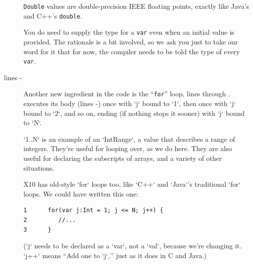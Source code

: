 \begin{description}
{\tt Double} values are double-precision IEEE floating points, exactly like Java's and C++'s
{\tt double}.  

You do need to supply
the type for a {\tt var} even when an initial value is provided.
The rationale is a bit involved, so we ask you just to take our word for it that  
for now, the compiler needs to be told the type of every {\tt var}. 

\item[lines  \xlref{mpi1-for}{7}- \xlref{mpi1-endfor}{11}]
Another new ingredient in the code is the ``{\tt for}''  loop, lines
 through .  
 executes its body (lines
-) once with \xcd`j` bound to \xcd`1`, then
once with \xcd`j` bound to \xcd`2`, and so on, ending (if nothing stops it
sooner) with \xcd`j` bound to \xcd`N`.  

\xcd`1..N` is an example of an \xcd`IntRange`, a value that describes a range
of integers.  They're useful for looping over, as we do here.  They are also
useful for declaring the subscripts of arrays, and a variety of other
situations. 


X10 has old-style \xcd`for` loops too, like \xcd`C++` and \xcd`Java`'s
traditional \xcd`for` loops.  We could have written this one:
\begin{verbatim}
1      for(var j:Int = 1; j <= N; j++) {
2         //...
3      }
\end{verbatim}
(\xcd`j` needs to be declared as a \xcd`var`, not a \xcd`val`, because we're
changing it.  \xcd`j++` means ``Add one to \xcd`j`,'' just as it does in C and
Java.)


\end{description}
